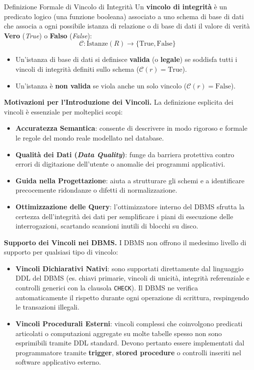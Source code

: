 \documentclass[12pt]{extarticle}
\begin{document}
\begin{cbox}{Definizione Formale di Vincolo di Integrità}
\noindent Un \textbf{vincolo di integrità} è un predicato logico (una funzione booleana) associato a uno schema di base di dati che associa a ogni possibile istanza di relazione o di base di dati il valore di verità \textbf{Vero} (\textit{True}) o \textbf{Falso} (\textit{False}):
$$\mathcal{C}: \text{Istanze}(R) \longrightarrow \{\text{True}, \text{False}\}$$
\begin{itemize}
    \item Un'istanza di base di dati si definisce \textbf{valida} (o \textbf{legale}) se soddisfa tutti i vincoli di integrità definiti sullo schema ($\mathcal{C}(r) = \text{True}$).
    \item Un'istanza è \textbf{non valida} se viola anche un solo vincolo ($\mathcal{C}(r) = \text{False}$).
\end{itemize}
\end{cbox}

\medskip
\noindent \textbf{Motivazioni per l'Introduzione dei Vincoli.} La definizione esplicita dei vincoli è essenziale per molteplici scopi:
\begin{itemize}
    \item \textbf{Accuratezza Semantica}: consente di descrivere in modo rigoroso e formale le regole del mondo reale modellato nel database.
    \item \textbf{Qualità dei Dati (\textit{Data Quality})}: funge da barriera protettiva contro errori di digitazione dell'utente o anomalie dei programmi applicativi.
    \item \textbf{Guida nella Progettazione}: aiuta a strutturare gli schemi e a identificare precocemente ridondanze o difetti di normalizzazione.
    \item \textbf{Ottimizzazione delle Query}: l'ottimizzatore interno del DBMS sfrutta la certezza dell'integrità dei dati per semplificare i piani di esecuzione delle interrogazioni, scartando scansioni inutili di blocchi su disco.
\end{itemize}

\medskip
\noindent \textbf{Supporto dei Vincoli nei DBMS.} I DBMS non offrono il medesimo livello di supporto per qualsiasi tipo di vincolo:
\begin{itemize}
    \item \textbf{Vincoli Dichiarativi Nativi}: sono supportati direttamente dal linguaggio DDL del DBMS (es. chiavi primarie, vincoli di unicità, integrità referenziale e controlli generici con la clausola \texttt{CHECK}). Il DBMS ne verifica automaticamente il rispetto durante ogni operazione di scrittura, respingendo le transazioni illegali.
    \item \textbf{Vincoli Procedurali Esterni}: vincoli complessi che coinvolgono predicati articolati o computazioni aggregate su molte tabelle spesso non sono esprimibili tramite DDL standard. Devono pertanto essere implementati dal programmatore tramite \textbf{trigger}, \textbf{stored procedure} o controlli inseriti nel software applicativo esterno.
\end{itemize}
\end{document}
